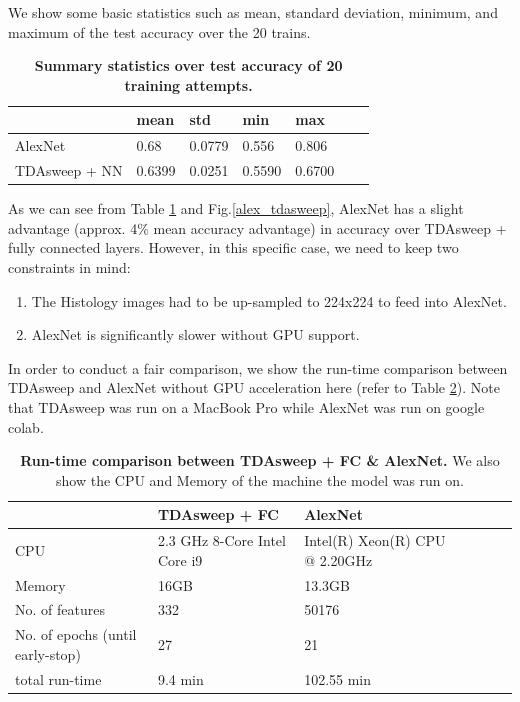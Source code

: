 \documentclass{article}
\begin{document}
We show some basic statistics such as mean, standard deviation, minimum, and maximum of the test accuracy over the 20 trains.
\begin{table}[!ht]
\centering
\caption{{\bf Summary statistics over test accuracy of 20 training attempts.}}
\begin{tabular}{|l|l|l|l|l|l|l|}
\hline
\multicolumn{1}{|l|}{} & \multicolumn{1}{|l|}{\bf mean} & \multicolumn{1}{|l|}{\bf std} & \multicolumn{1}{|l|}{\bf min}& \multicolumn{1}{|l|}{\bf max} \\ \hline
AlexNet & 0.68 & 0.0779 & 0.556 & 0.806 \\ \hline
TDAsweep + NN & 0.6399 & 0.0251 & 0.5590 & 0.6700 \\ \hline

\end{tabular}
\label{alex_tda_stat}
\end{table}

As we can see from Table \ref{alex_tda_stat} and Fig.\ref{alex_tdasweep}, AlexNet has a slight advantage (approx. 4\% mean accuracy advantage) in accuracy over TDAsweep + fully connected layers. However, in this specific case, we need to keep two constraints in mind:

\begin{enumerate}
  \item The Histology images had to be up-sampled to 224x224 to feed into AlexNet.
  \item AlexNet is significantly slower without GPU support.
\end{enumerate}

In order to conduct a fair comparison, we show the run-time comparison between TDAsweep and AlexNet without GPU acceleration here (refer to Table \ref{run_ta}). Note that TDAsweep was run on a MacBook Pro while AlexNet was run on google colab.

\begin{table}[!ht]
\centering
\caption{{\bf Run-time comparison between TDAsweep + FC \& AlexNet.} We also show the CPU and Memory of the machine the model was run on.}
\begin{tabular}{|l|l|l|l|l|l|l|}
\hline
\multicolumn{1}{|l|}{} & \multicolumn{1}{|l|}{\bf TDAsweep + FC} & \multicolumn{1}{|l|}{\bf AlexNet}\\ \hline
CPU & 2.3 GHz 8-Core Intel Core i9 & Intel(R) Xeon(R) CPU @ 2.20GHz \\ \hline
Memory & 16GB & 13.3GB \\ \hline
No. of features & 332 & 50176  \\ \hline
No. of epochs (until early-stop) & 27 & 21 \\ \hline
total run-time & 9.4 min & 102.55 min  \\ \hline
\end{tabular}
\label{run_ta}
\end{table}
\end{document}
